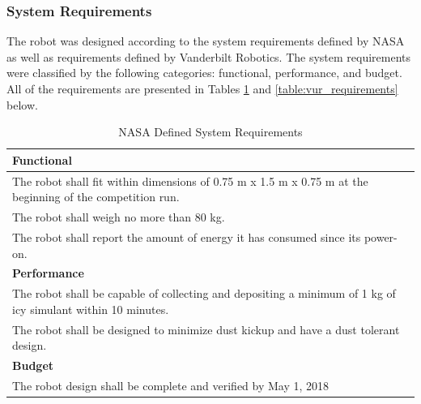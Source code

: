 \documentclass[class=article, crop=false]{standalone}
\begin{document}
	\subsubsection{System Requirements}
	The robot was designed according to the system requirements defined by NASA as well as requirements defined by Vanderbilt Robotics. The system requirements were classified by the following categories: functional, performance, and budget. All of the requirements are presented in Tables \ref{table:nasa_requirements} and  \ref{table:vur_requirements} below.
	\FloatBarrier
	\begin{table}[h]
	\footnotesize
	\centering
	\begin{tabular}{ | m{38em} | } 
 	\hline
 		\textbf{Functional} \\ 
 		\hline
 		The robot shall fit within dimensions of 0.75 m x 1.5 m x 0.75 m at the beginning of the competition run. \\ 
 		\hline
 		The robot shall weigh no more than 80 kg. \\ 
 		\hline
 		The robot shall report the amount of energy it has consumed since its power-on. \\
 		\hline
 		\textbf{Performance} \\ 
 		\hline
 		The robot shall be capable of collecting and depositing a minimum of 1 kg of icy simulant within 10 minutes. \\
 		\hline
 		The robot shall be designed to minimize dust kickup and have a dust tolerant design.  \\
 		\hline
 		\textbf{Budget} \\
 		\hline
		The robot design shall be complete and verified by May 1, 2018 \\
 	\hline
	\end{tabular}
	\caption{NASA Defined System Requirements}
		\label{table:nasa_requirements}
	\end{table}
	\FloatBarrier
	
\end{document}
